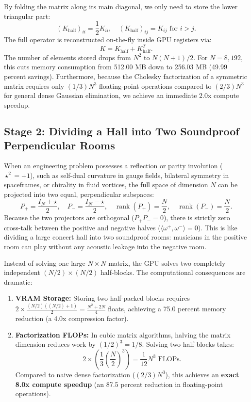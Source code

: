 \documentclass[11pt,a4paper]{article}
\begin{document}
By folding the matrix along its main diagonal, we only need to store the lower triangular part:
\begin{equation}
(K_{\mathrm{half}})_{ii} = \frac{1}{2} K_{ii}, \quad (K_{\mathrm{half}})_{ij} = K_{ij} \text{ for } i > j.
\end{equation}
The full operator is reconstructed on-the-fly inside GPU registers via:
\begin{equation}
K = K_{\mathrm{half}} + K_{\mathrm{half}}^T.
\end{equation}
The number of elements stored drops from $N^2$ to $N(N+1)/2$. For $N = 8,192$, this cuts memory consumption from 512.00 MB down to 256.03 MB (49.99 percent savings). Furthermore, because the Cholesky factorization of a symmetric matrix requires only $(1/3)N^3$ floating-point operations compared to $(2/3)N^3$ for general dense Gaussian elimination, we achieve an immediate 2.0x compute speedup.

\subsection{Stage 2: Dividing a Hall into Two Soundproof Perpendicular Rooms}
When an engineering problem possesses a reflection or parity involution ($\star^2 = +1$), such as self-dual curvature in gauge fields, bilateral symmetry in spaceframes, or chirality in fluid vortices, the full space of dimension $N$ can be projected into two equal, perpendicular subspaces:
\begin{equation}
P_+ = \frac{I_N + \star}{2}, \quad P_- = \frac{I_N - \star}{2}, \quad \operatorname{rank}(P_+) = \frac{N}{2}, \quad \operatorname{rank}(P_-) = \frac{N}{2}.
\end{equation}
Because the two projectors are orthogonal ($P_+ P_- = 0$), there is strictly zero cross-talk between the positive and negative halves ($\langle \omega^+, \omega^- \rangle = 0$). 
This is like dividing a large concert hall into two soundproof rooms: musicians in the positive room can play without any acoustic leakage into the negative room.

Instead of solving one large $N \times N$ matrix, the GPU solves two completely independent $(N/2) \times (N/2)$ half-blocks. 
The computational consequences are dramatic:
\begin{enumerate}
    \item \textbf{VRAM Storage:} Storing two half-packed blocks requires $2 \times \frac{(N/2)((N/2)+1)}{2} = \frac{N^2 + 2N}{4}$ floats, achieving a 75.0 percent memory reduction (a 4.0x compression factor).
    \item \textbf{Factorization FLOPs:} In cubic matrix algorithms, halving the matrix dimension reduces work by $(1/2)^3 = 1/8$. Solving two half-blocks takes:
    \begin{equation}
    2 \times \left( \frac{1}{3} \left(\frac{N}{2}\right)^3 \right) = \frac{1}{12} N^3 \text{ FLOPs}.
    \end{equation}
    Compared to naive dense factorization ($(2/3)N^3$), this achieves an \textbf{exact 8.0x compute speedup} (an 87.5 percent reduction in floating-point operations).
\end{enumerate}
\end{document}
